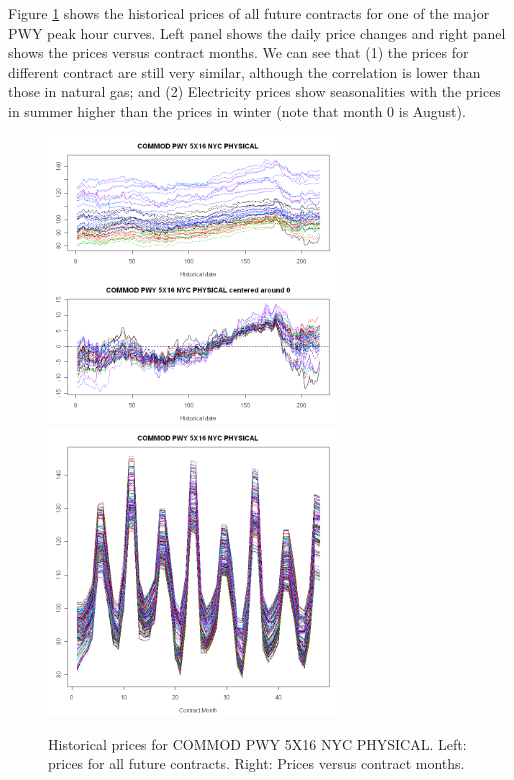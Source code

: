 Figure \ref{pwy-hist} shows the historical prices of
all future contracts for one of
the major PWY peak hour curves. Left panel shows the 
daily price changes and right panel shows the prices
versus contract months. We can see that (1) the prices
for different contract are still very similar, although
the correlation is lower than those in natural gas;
and (2) Electricity prices show seasonalities with the prices
in summer higher than the prices in winter (note that month 0 is
August). 
\begin{figure}[htbp]
\centering
\includegraphics[width=3in, height=3in]{figures/pwy01.png}
\includegraphics[width=3in, height=3in]{figures/pwy02.png}
\caption{Historical prices for COMMOD PWY 5X16 NYC PHYSICAL.
Left: prices for all future contracts. 
Right: Prices versus contract months.}
\label{pwy-hist}
\end{figure}

